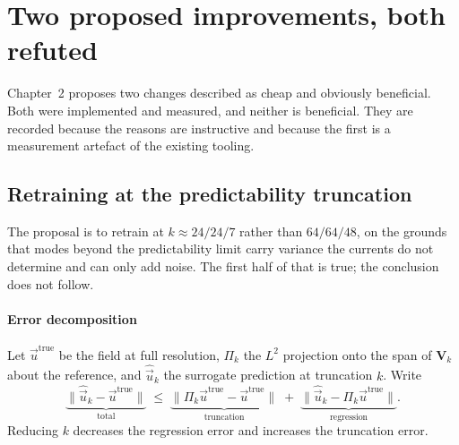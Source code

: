 \documentclass[11pt,a4paper]{article}
\newcommand{\vect}[1]{\mathbf{#1}}
\theoremstyle{plain}
\theoremstyle{definition}
\theoremstyle{remark}
\begin{document}
\section{Two proposed improvements, both refuted}
\label{sec:refuted}

Chapter~2 proposes two changes described as cheap and obviously beneficial. Both
were implemented and measured, and neither is beneficial. They are recorded
because the reasons are instructive and because the first is a measurement
artefact of the existing tooling.

\subsection{Retraining at the predictability truncation}
\label{auto:retraining-at-the-predictability-truncat}

The proposal is to retrain at $k \approx 24/24/7$ rather than $64/64/48$, on the
grounds that modes beyond the predictability limit carry variance the currents
do not determine and can only add noise. The first half of that is true; the
conclusion does not follow.

\paragraph{Error decomposition}
Let $\vec{u}^{\mathrm{true}}$ be the field at full resolution, $\Pi_k$ the
$L^2$ projection onto the span of $\vect{V}_k$ about the reference, and
$\widehat{\vec{u}}_k$ the surrogate prediction at truncation $k$. Write
\begin{equation}
\label{eq:decomp}
\underbrace{\|\widehat{\vec{u}}_k - \vec{u}^{\mathrm{true}}\|}_{\text{total}}
\;\le\;
\underbrace{\|\Pi_k\vec{u}^{\mathrm{true}} - \vec{u}^{\mathrm{true}}\|}_{\text{truncation}}
\;+\;
\underbrace{\|\widehat{\vec{u}}_k - \Pi_k\vec{u}^{\mathrm{true}}\|}_{\text{regression}} .
\end{equation}
Reducing $k$ decreases the regression error and increases the truncation error.
\end{document}
